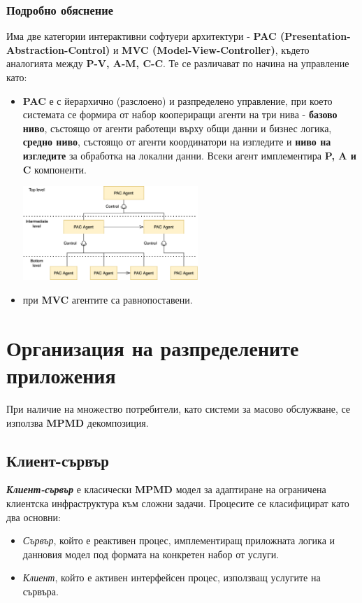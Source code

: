 \documentclass[fleqn,12pt]{article}
\begin{document}
\subsubsection{Подробно обяснение}
Има две категории интерактивни софтуери архитектури - \textbf{PAC (Presentation-Abstraction-Control)} и \textbf{MVC (Model-View-Controller)}, където аналогията между \textbf{P-V, A-M, C-C}.
Те се различават по начина на управление като:
\begin{itemize}
    \item \textbf{PAC} е с йерархично (разслоено) и разпределено управление, при което системата се формира от набор коопериращи агенти на три нива - \textbf{базово ниво}, състоящо от агенти работещи върху общи данни и бизнес логика, \textbf{средно ниво}, състоящо от агенти координатори на изгледите и \textbf{ниво на изгледите} за обработка на локални данни.
    Всеки агент имплементира \textbf{P, A и C} компоненти.
    \begin{center} \includegraphics[width=250px]{pac.png} \end{center}
    \item при \textbf{MVC} агентите са равнопоставени.
\end{itemize}

\section{Организация на разпределените приложения}
При наличие на множество потребители, като системи за масово обслужване, се използва \textbf{MPMD} декомпозиция.

\subsection{Клиент-сървър}

\textbf{\textit{Клиент-сървър}} е класически \textbf{MPMD} модел за адаптиране на ограничена клиентска инфраструктура към сложни задачи.
Процесите се класифицират като два основни:
\begin{itemize}
    \item \textit{Сървър}, който е реактивен процес, имплементиращ приложната логика и данновия модел под формата на конкретен набор от услуги.
    \item \textit{Клиент}, който е активен интерфейсен процес, използващ услугите на сървъра.
\end{itemize}
\end{document}
